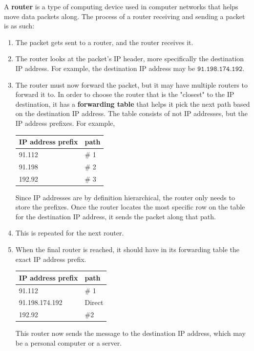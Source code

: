 \documentclass{article}
\begin{document}
  \begin{definition}
  A \textbf{router} is a type of computing device used in computer networks that helps move data packets along. The process of a router receiving and sending a packet is as such: 
  \begin{enumerate}
      \item The packet gets sent to a router, and the router receives it. 
      \item The router looks at the packet's IP header, more specifically the destination IP address. For example, the destination IP address may be $\texttt{91.198.174.192}$. 
      \item The router must now forward the packet, but it may have multiple routers to forward it to. In order to choose the router that is the "closest" to the IP destination, it has a \textbf{forwarding table} that helps it pick the next path based on the destination IP address. The table consists of not IP addresses, but the IP address prefixes. For example, 
      \begin{center}
      \begin{tabular}{l|l}
          IP address prefix & path\\
          \hline
          91.112 & \# 1\\
          91.198 & \# 2 \\
          192.92 & \# 3
      \end{tabular}
      \end{center}
      Since IP addresses are by definition hierarchical, the router only needs to store the prefixes. Once the router locates the most specific row on the table for the destination IP address, it sends the packet along that path. 
      \item This is repeated for the next router. 
      \item When the final router is reached, it should have in its forwarding table the exact IP address prefix. 
      \begin{center}
      \begin{tabular}{l|l}
          IP address prefix & path \\
          \hline
          91.112 & \# 1 \\
          91.198.174.192 & Direct \\
          192.92 & \#2 
      \end{tabular}
      \end{center}
      This router now sends the message to the destination IP address, which may be a personal computer or a server. 
  \end{enumerate}
  \end{definition}
\end{document}
